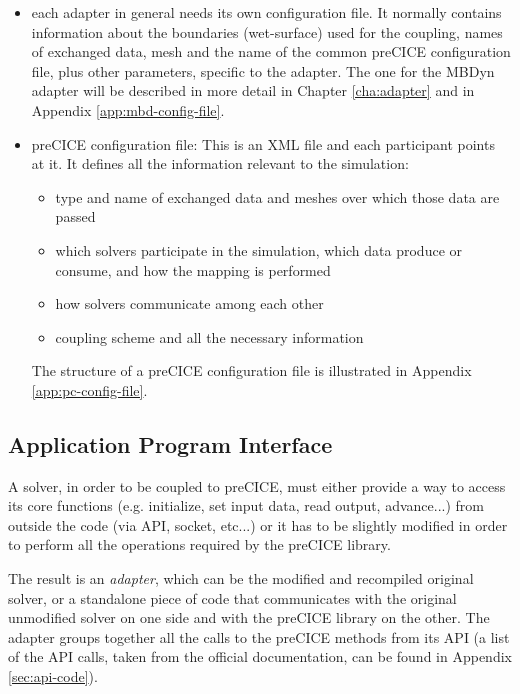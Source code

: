 \begin{itemize}
	\item each adapter in general needs its own configuration file. It normally contains information about the boundaries (wet-surface) used for the coupling, names of exchanged data, mesh and the name of the common preCICE configuration file, plus other parameters, specific to the adapter. The one for the MBDyn adapter will be described in more detail in Chapter \ref{cha:adapter} and in Appendix \ref{app:mbd-config-file}.
	\item preCICE configuration file: This is an XML file and each participant points at it. It defines all the information relevant to the simulation:
	\begin{itemize}
		\item type and name of exchanged data and meshes over which those data are passed
		\item which solvers participate in the simulation, which data produce or consume, and how the mapping is performed
		\item how solvers communicate among each other
		\item coupling scheme and all the necessary information 
	\end{itemize}
	
	The structure of a preCICE configuration file is illustrated in Appendix \ref{app:pc-config-file}.
		
\end{itemize}


\subsection{Application Program Interface}
\label{sec:pc-api}

A solver, in order to be coupled to preCICE, must either provide a way to access its core functions (e.g. initialize, set input data, read output, advance...) from outside the code (via API, socket, etc...) or it has to be slightly modified in order to perform all the operations required by the preCICE library.

The result is an \textit{adapter}, which can be the modified and recompiled original solver, or a standalone piece of code that communicates with the original unmodified solver on one side and with the preCICE library on the other. The adapter groups together all the calls to the preCICE methods from its API (a list of the API calls, taken from the official documentation, can be found in Appendix \ref{sec:api-code}).

